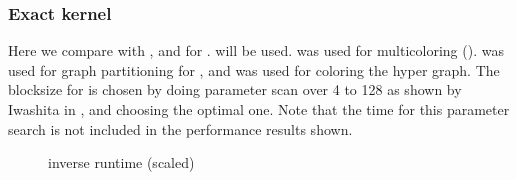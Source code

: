 

\subsubsection{Exact kernel}
Here we compare  \RACE with \ABMC, \MC and \MKL for \SymmSpmv.  will be used. \COLPACK \cite{COLPACK} %
was used for multicoloring (\MC). \METIS \cite{METIS}  was used for graph partitioning for \ABMC, and \COLPACK was used for coloring the hyper graph. The blocksize for \ABMC is chosen by doing parameter scan over 4 to 128 as shown by Iwashita \etal in \cite{ABMC}, and choosing the optimal one. Note that the time for this parameter search is not included in the performance results shown. 


\begin{figure}[thbp]
	\centering
	\hspace{1em}
	\caption{\SYMMKACZ inverse runtime (scaled)}
	\label{fig:symmkacz_dp}
\end{figure}

